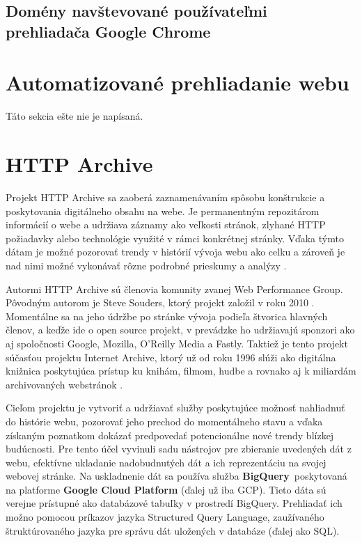 \subsection{Domény navštevované používateľmi prehliadača Google Chrome}
\label{chrome-user-experience-report}


\section{Automatizované prehliadanie webu}
\label{selenium}

Táto sekcia ešte nie je napísaná.


\section{HTTP Archive}
\label{httparchive}

Projekt HTTP Archive sa zaoberá zaznamenávaním spôsobu konštrukcie a poskytovania digitálneho obsahu na webe. Je permanentným repozitárom informácií o webe a udržiava záznamy ako veľkosti
stránok, zlyhané HTTP požiadavky alebo technológie využité v rámci konkrétnej stránky. Vďaka týmto dátam je možné pozorovať trendy v histórií vývoja webu ako celku a zároveň je nad nimi možné vykonávať
rôzne podrobné prieskumy a analýzy \cite{httparchive-about}. 

Autormi HTTP Archive sú členovia komunity zvanej Web Performance Group. Pôvodným autorom je Steve Souders, ktorý projekt založil v roku 2010 \cite{httparchive-faq}.
Momentálne sa na jeho údržbe po stránke vývoja podieľa štvorica hlavných členov, a keďže ide o open source projekt, v prevádzke ho udržiavajú sponzori ako aj spoločnosti Google, Mozilla, O'Reilly Media a Fastly.
Taktiež je tento projekt súčasťou projektu Internet Archive, ktorý už od roku 1996 slúži ako digitálna knižnica poskytujúca prístup ku knihám, filmom, hudbe a rovnako aj k miliardám archivovaných webstránok \cite{httparchive-about}.

Cieľom projektu je vytvoriť a udržiavať služby poskytujúce možnosť nahliadnuť do histórie webu, pozorovať jeho prechod do momentálneho stavu a vďaka získaným poznatkom dokázať
predpovedať potencionálne nové trendy blízkej budúcnosti. 
Pre tento účel vyvinuli sadu nástrojov pre zbieranie uvedených dát z webu, efektívne ukladanie nadobudnutých dát a ich reprezentáciu na svojej webovej stránke.
Na uskladnenie dát sa používa služba \mbox{\textbf{BigQuery} poskytovaná} na platforme \textbf{Google Cloud Platform} (ďalej už iba GCP).
Tieto dáta sú verejne prístupné ako databázové tabuľky v prostredí BigQuery.
Prehliadať ich možno pomocou príkazov jazyka Structured Query Language, zaužívaného štruktúrovaného jazyka pre správu dát uložených v databáze (ďalej ako SQL).


